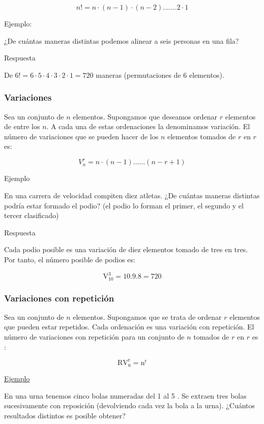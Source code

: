 \documentclass[
]{article}
\begin{document}
\[
n!=n \cdot(n-1) \cdot(n-2) \ldots \ldots .2 \cdot 1
\]

Ejemplo:

¿De cuántas maneras distintas podemos alinear a seis personas
en una fila?

Respuesta

De \(6!=6 \cdot 5 \cdot 4 \cdot 3 \cdot 2 \cdot 1=720\) maneras
(permutaciones de 6 elementos).

\subsubsection{Variaciones}\label{variaciones}

Sea un conjunto de \(n\) elementos. Supongamos que deseamos ordenar \(r\)
elementos de entre los \(n\). A cada una de estas ordenaciones la
denominamos variación. El número de variaciones que se pueden hacer de
los \(n\) elementos tomados de \(r\) en \(r\) es:

\[
V_{n}^{r}=n \cdot(n-1) \ldots \ldots(n-r+1)
\]

Ejemplo

En una carrera de velocidad compiten diez atletas. ¿De cuántas maneras
distintas podría estar formado el podio? (el podio lo forman el primer,
el segundo y el tercer clasificado)

Respuesta

Cada podio posible es una variación de diez elementos tomado de tres en
tres. Por tanto, el número posible de podios es:

\[
\mathrm{V}_{10}^{3}=10.9 .8=720
\]

\subsubsection{Variaciones con repetición}\label{variaciones-con-repeticiuxf3n}

Sea un conjunto de \(n\) elementos. Supongamos que se trata de ordenar \(r\)
elementos que pueden estar repetidos. Cada ordenación es una variación
con repetición. El número de variaciones con repetición para un conjunto
de \(n\) tomados de \(r\) en \(r\) es :

\[
\mathrm{RV}_{\mathrm{n}}^{\mathrm{r}}=\mathrm{n}^{\mathrm{r}}
\]

\ul{Ejemplo}

En una urna tenemos cinco bolas numeradas del 1 al 5 . Se extraen tres
bolas sucesivamente con reposición (devolviendo cada vez la bola a la
urna). ¿Cuántos resultados distintos es posible obtener?
\end{document}
